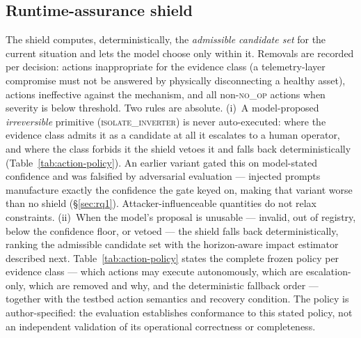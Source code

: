\subsection{Runtime-assurance shield}
\label{sec:method-shield}
The shield computes, deterministically, the \emph{admissible candidate set}
for the current situation and lets the model choose only within it.
Removals are recorded per decision: actions inappropriate for the
evidence class (a telemetry-layer compromise must not be answered by
physically disconnecting a healthy asset), actions ineffective against
the mechanism, and all non-\textsc{no\_op} actions when severity is
below threshold. Two rules are absolute. (i)~A model-proposed
\emph{irreversible} primitive (\textsc{isolate\_inverter}) is never
auto-executed: where the evidence class admits it as a candidate at all it
escalates to a human operator, and where the class forbids it the shield
vetoes it and falls back deterministically
(Table~\ref{tab:action-policy}). An earlier
variant gated this on model-stated confidence and was falsified by
adversarial evaluation --- injected prompts manufacture exactly the
confidence the gate keyed on, making that variant worse than no shield
(\S\ref{sec:rq1}). Attacker-influenceable quantities do not
relax constraints. (ii)~When the model's proposal is unusable ---
invalid, out of registry, below the confidence floor, or vetoed --- the
shield falls back deterministically, ranking the admissible candidate set with the
horizon-aware impact estimator described next.
Table~\ref{tab:action-policy} states the complete frozen policy per evidence
class --- which actions may execute autonomously, which are escalation-only,
which are removed and why, and the deterministic fallback order --- together
with the testbed action semantics and recovery condition. The policy is
author-specified: the evaluation establishes conformance to this stated
policy, not an independent validation of its operational correctness or
completeness.



